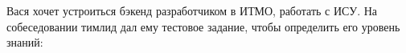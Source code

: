 \question
Вася хочет устроиться бэкенд разработчиком в ИТМО, работать с ИСУ. На собеседовании тимлид дал ему тестовое задание, чтобы определить его уровень знаний:
\\
\begin{figure}[h]

\begin{minipage}[h]{0.55\linewidth}
\end{minipage}
\begin{minipage}[h]{0.45\linewidth}
\end{minipage}
\end{figure}


